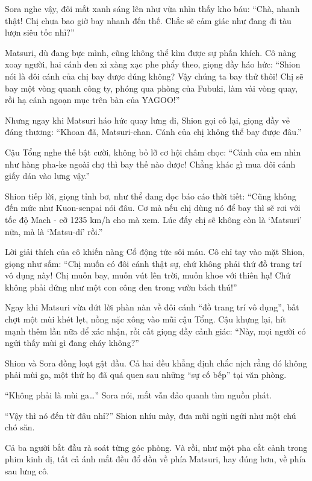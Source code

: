 \documentclass[../main.tex]{subfiles}
\begin{document}
Sora nghe vậy, đôi mắt xanh sáng lên như vừa nhìn thấy kho báu: ``Chà, nhanh thật! Chị chưa bao giờ bay nhanh đến thế. Chắc sẽ cảm giác như đang đi tàu lượn siêu tốc nhỉ?''

Matsuri, dù đang bực mình, cũng không thể kìm được sự phấn khích. Cô nàng xoay người, hai cánh đen xì xàng xạc phe phẩy theo, giọng đầy háo hức: ``Shion nói là đôi cánh của chị bay được đúng không? Vậy chúng ta bay thử thôi! Chị sẽ bay một vòng quanh công ty, phóng qua phòng của Fubuki, làm vài vòng quay, rồi hạ cánh ngoạn mục trên bàn của YAGOO!''

Nhưng ngay khi Matsuri háo hức quay lưng đi, Shion gọi cô lại, giọng đầy vẻ đáng thương: ``Khoan đã, Matsuri-chan. Cánh của chị không thể bay được đâu.''

Cậu Tổng nghe thế bật cười, không bỏ lỡ cơ hội châm chọc: ``Cánh của em nhìn như hàng pha-ke ngoài chợ thì bay thế nào được! Chẳng khác gì mua đôi cánh giấy dán vào lưng vậy.''

Shion tiếp lời, giọng tỉnh bơ, như thể đang đọc báo cáo thời tiết: ``Cũng không đến mức như Kuon-senpai nói đâu. Cơ mà nếu chị dùng nó để bay thì sẽ rơi với tốc độ Mach - cỡ 1235 km/h cho mà xem. Lúc đấy chị sẽ không còn là `Matsuri' nữa, mà là `Matsu-dí' rồi.''

Lời giải thích của cô khiến nàng Cổ động tức sôi máu. Cô chỉ tay vào mặt Shion, giọng như sấm: ``Chị muốn có đôi cánh thật sự, chứ không phải thứ đồ trang trí vô dụng này! Chị muốn bay, muốn vút lên trời, muốn khoe với thiên hạ! Chứ không phải đứng như một con công đen trong vườn bách thú!''

Ngay khi Matsuri vừa dứt lời phàn nàn về đôi cánh ``đồ trang trí vô dụng'', bất chợt một mùi khét lẹt, nồng nặc xông vào mũi cậu Tổng. Cậu khựng lại, hít mạnh thêm lần nữa để xác nhận, rồi cất giọng đầy cảnh giác: ``Này, mọi người có ngửi thấy mùi gì đang cháy không?''

Shion và Sora đồng loạt gật đầu. Cả hai đều khẳng định chắc nịch rằng đó không phải mùi ga, một thứ họ đã quá quen sau những ``sự cố bếp'' tại văn phòng.

``Không phải là mùi ga\dots'' Sora nói, mắt vẫn đảo quanh tìm nguồn phát.

``Vậy thì nó đến từ đâu nhỉ?'' Shion nhíu mày, đưa mũi ngửi ngửi như một chú chó săn.

Cả ba người bắt đầu rà soát từng góc phòng. Và rồi, như một pha cắt cảnh trong phim kinh dị, tất cả ánh mắt đều đổ dồn về phía Matsuri, hay đúng hơn, về phía sau lưng cô.
\end{document}
